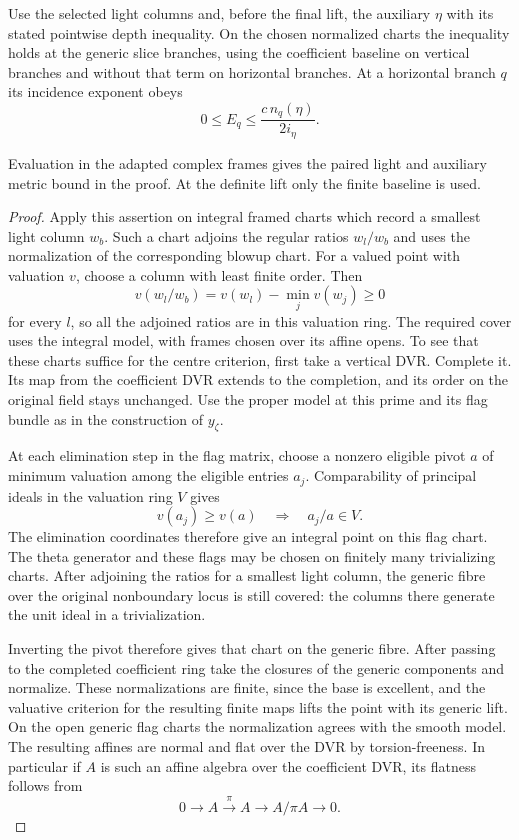 \begin{proposition}\label{prop:slice-chart-metric-readings}
Use the selected light columns and, before the final lift,
the auxiliary \(\eta\) with its stated pointwise depth
inequality. On the chosen normalized charts the inequality
holds at the generic slice branches, using the coefficient
baseline on vertical branches and without that term on
horizontal branches. At a horizontal branch \(q\) its incidence exponent obeys
\[
 0\le E_q\le\frac{c\,n_q(\eta)}{2i_\eta}.
\]

Evaluation in the adapted complex frames gives the paired light and
auxiliary metric bound in the proof. At the definite lift
only the finite baseline is used.
\end{proposition}

\begin{proof}
Apply this assertion on integral framed charts which record a
smallest light column \(w_b\). Such a chart adjoins the regular
ratios \(w_l/w_b\) and uses the normalization of the corresponding
blowup chart. For a valued point with valuation \(v\), choose a column with least
finite order. Then
\[
 v(w_l/w_b)=v(w_l)-\min_j v(w_j)\ge0
\]
for every \(l\), so all the adjoined ratios are in this valuation ring. The required cover uses the
integral model, with frames chosen over its affine opens. To see that these charts suffice for the centre criterion, first
take a vertical DVR. Complete it. Its map from the coefficient
DVR extends to the completion, and its order on the original
field stays unchanged. Use the proper model at this prime
and its flag bundle as in the construction of \(y_\zeta\).

At each elimination step in the flag matrix, choose a nonzero eligible pivot \(a\) of minimum valuation among the eligible entries \(a_j\). Comparability of principal ideals in the valuation ring \(V\) gives
\[
        v(a_j)\ge v(a)\quad\Longrightarrow\quad a_j/a\in V .
\]
The elimination coordinates therefore give an integral point on this flag chart.
The theta generator and these flags may be chosen on finitely
many trivializing charts. After adjoining the ratios for a
smallest light column, the generic fibre over the original
nonboundary locus is still covered: the columns there
generate the unit ideal in a trivialization.

Inverting the
pivot therefore gives that chart on the generic fibre.
After passing to the completed coefficient ring take the closures
of the generic components and normalize. These normalizations
are finite, since the base is excellent, and the valuative
criterion for the resulting finite maps lifts the point with
its generic lift. On the open generic flag charts the
normalization agrees with the smooth model. The resulting
affines are normal and flat over the DVR by torsion-freeness.
In particular if \(A\) is such an affine algebra over the coefficient DVR, its flatness follows from
\[
  0\longrightarrow A\xrightarrow{\ \pi\ }A\longrightarrow A/\pi A\longrightarrow0.
\]


\end{proof}
